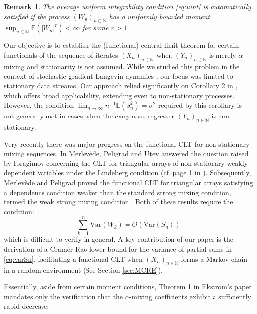 \documentclass[a4paper,10pt]{article}
\newtheorem{remark}[theorem]{Remark}
\newcommand{\N}{\mathbb{N}}
\newcommand{\E}{\mathbb{E}}
\newcommand{\var}{\mathrm{Var}}
\begin{document}
\begin{remark}\label{rem:Hansen}
	The average uniform integrability condition \eqref{eq:uint} is automatically satisfied if the process $(W_n)_{n\in\N}$ has a uniformly bounded moment $\sup_{n\in\N}\E (|W_n|^r)<\infty$
	for some $r>1$.
\end{remark}

Our objective is to establish the (functional) central limit theorem for certain functionals of the sequence of iterates $(X_n)_{n\in\N}$ when $(Y_n)_{n\in\N}$ is merely $\alpha$-mixing and stationarity is not assumed. While we studied this problem in the context of stochastic gradient Langevin dynamics \cite{lovasCLT}, our focus was limited to stationary data streams. Our approach relied significantly on Corollary 2 in \cite{herrndorf1984}, which offers broad applicability, extending even to non-stationary processes. However, the condition $\lim_{n\to\infty} n^{-1}\mathbb{E}(S_n^2) = \sigma^2$ required by this corollary is not generally met in cases  when the exogenous regressor $(Y_n)_{n\in\mathbb{N}}$ is non-stationary.

Very recently there was major progress on the functional CLT for non-stationary mixing sequences.
In \cite{merlevede2019functional} Merlev{\`e}de, Peligrad and Utev answered the question raised by Ibragimov concerning the CLT for triangular arrays of non-stationary weakly dependent variables under the Lindeberg condition (cf. page 1 in \cite{hafouta2021functional}). Subsequently, Merlev{\`e}de and Peligrad proved the functional CLT for triangular arrays satisfying a dependence condition weaker than the standard strong mixing condition, termed the weak strong mixing condition \cite{merlevede2020functional}. Both of these results require the condition:
\begin{equation}\label{eq:varSn}
	\sum_{k=1}^{n} \var(W_k) = O(\var(S_n))
\end{equation}
which is difficult to verify in general. A key contribution of our paper is the derivation of a Cramér-Rao lower bound for the variance of partial sums in \eqref{eq:varSn}, facilitating a functional CLT when $(X_n)_{n\in\N}$ forms a Markov chain in a random environment (See Section \ref{sec:MCRE}).

Essentially, aside from certain moment conditions, Theorem 1 in Ekstr\"om's paper \cite{ekstrom2014general} mandates only the verification that the $\alpha$-mixing coefficients exhibit a sufficiently rapid decrease:
\end{document}
